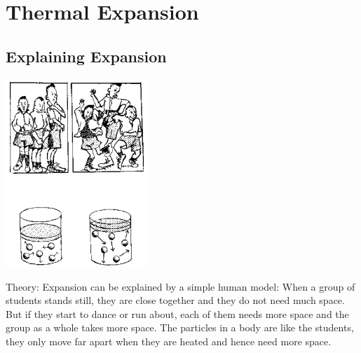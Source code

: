 \section{Thermal Expansion}

\begin{multicols}{2}


\subsection{Explaining Expansion}

\begin{center}
\includegraphics[width=0.4\textwidth]{./img/source/explaining-expansion.png}
\end{center}

\begin{description*}
\item[Theory:]{Expansion can be explained by a simple human model: When a group of students stands still, they are close together and they do not need much space. But if they start to dance or run about, each of them needs more space and the group as a whole takes more space. The particles in a body are like the students, they only move far apart when they are heated and hence need more space.}
\end{description*}



\end{multicols}
